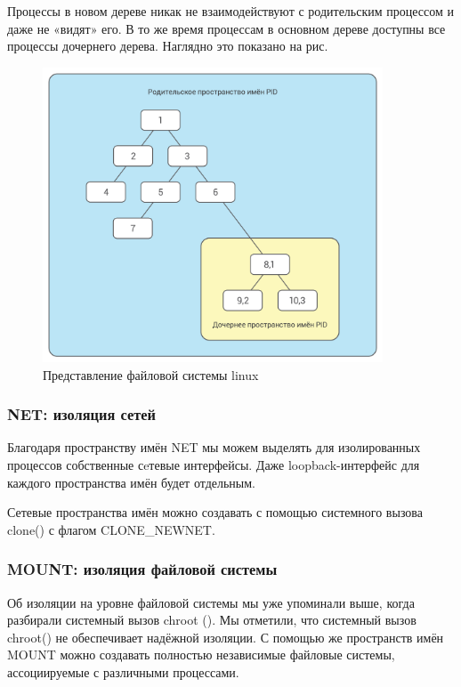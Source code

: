 Процессы в новом дереве никак не взаимодействуют с родительским процессом и даже не «видят» его. В то же время процессам в основном дереве доступны все процессы дочернего дерева. Наглядно это показано на рис.

\begin{figure}[h!]
\centering
\includegraphics[width=0.9\textwidth]{img/pid.png}
\caption{Представление файловой системы linux}
\label{fig4}
\end{figure}

\subsubsection{NET: изоляция сетей}

Благодаря пространству имён NET мы можем выделять для изолированных процессов собственные сeтевые интерфейсы. Даже loopback-интерфейс для каждого пространства имён будет отдельным.

Сетевые пространства имён можно создавать с помощью системного вызова clone() с флагом CLONE\_NEWNET. 

\subsubsection{MOUNT: изоляция файловой системы}

Об изоляции на уровне файловой системы мы уже упоминали выше, когда разбирали системный вызов chroot (). Мы отметили, что системный вызов chroot() не обеспечивает надёжной изоляции. С помощью же пространств имён MOUNT можно создавать полностью независимые файловые системы, ассоциируемые с различными процессами.

